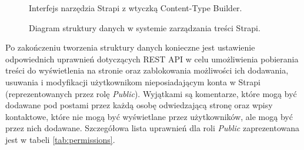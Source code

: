 \documentclass[a4paper, 12pt]{article}
\numberwithin{figure}{section}
\begin{document}
\begin{sloppypar}
\begin{figure}[H] 
    \centering
   \caption{Interfejs narzędzia Strapi z wtyczką Content-Type Builder.}
   \label{fig:strapi-interface-1.jpg}
\end{figure}

\begin{figure}[H] 
    \centering
   \caption{Diagram struktury danych w systemie zarządzania treści Strapi.}
   \label{fig:diagram-typu-tresci.png}
\end{figure}

\newpage

Po zakończeniu tworzenia struktury danych konieczne jest ustawienie odpowiednich uprawnień dotyczących REST API w celu umożliwienia pobierania treści do wyświetlenia na stronie oraz zablokowania możliwości ich dodawania, usuwania i modyfikacji użytkownikom nieposiadającym konta w Strapi (reprezentowanych przez rolę \textit{Public}). Wyjątkami są komentarze, które mogą być dodawane pod postami przez każdą osobę odwiedzającą stronę oraz wpisy kontaktowe, które nie mogą być wyświetlane przez użytkowników, ale mogą być przez nich dodawane. Szczegółowa lista uprawnień dla roli \textit{Public} zaprezentowana jest w tabeli \ref{tab:permissions}. 


\end{sloppypar}
\end{document}
